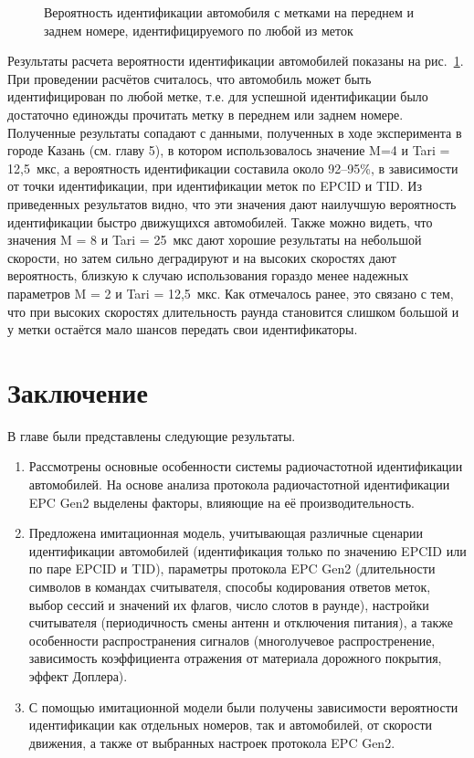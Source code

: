 \begin{figure}[h]
	\caption{Вероятность идентификации автомобиля с метками на переднем и заднем номере, идентифицируемого по любой из меток}
	\label{fig:ch2_vehicle_identification_rate}
\end{figure}

Результаты расчета вероятности идентификации автомобилей показаны на рис.~\ref{fig:ch2_vehicle_identification_rate}. При проведении расчётов считалось, что автомобиль может быть идентифицирован по любой метке, т.е. для успешной идентификации было достаточно единожды прочитать метку в переднем или заднем номере. Полученные результаты сопадают с данными, полученных в ходе эксперимента в городе Казань (см. главу 5), в котором использовалось значение M=4 и Tari = 12,5~мкс, а вероятность идентификации составила около 92--95\%, в зависимости от точки идентификации, при идентификации меток по EPCID и TID. Из приведенных результатов видно, что эти значения дают наилучшую вероятность идентификации быстро движущихся автомобилей. Также можно видеть, что значения M = 8 и Tari = 25~мкс дают хорошие результаты на небольшой скорости, но затем сильно деградируют и на высоких скоростях дают вероятность, близкую к случаю использования гораздо менее надежных параметров M = 2 и Tari = 12,5~мкс. Как отмечалось ранее, это связано с тем, что при высоких скоростях длительность раунда становится слишком большой и у метки остаётся мало шансов передать свои идентификаторы.



\section{Заключение}\label{sec:ch2_conclusion}
В главе были представлены следующие результаты.
\begin{enumerate}
	\item Рассмотрены основные особенности системы радиочастотной идентификации автомобилей. На основе анализа протокола радиочастотной идентификации EPC Gen2 выделены факторы, влияющие на её производительность.
	\item Предложена имитационная модель, учитывающая различные сценарии идентификации автомобилей (идентификация только по значению EPCID или по паре EPCID и TID), параметры протокола EPC Gen2 (длительности символов в командах считывателя, способы кодирования ответов меток, выбор сессий и значений их флагов, число слотов в раунде), настройки считывателя (периодичность смены антенн и отключения питания), а также особенности распространения сигналов (многолучевое распростренение, зависимость коэффициента отражения от материала дорожного покрытия, эффект Доплера).
	\item С помощью имитационной модели были получены зависимости вероятности идентификации как отдельных номеров, так и автомобилей, от скорости движения, а также от выбранных настроек протокола EPC Gen2.
\end{enumerate}

\FloatBarrier
